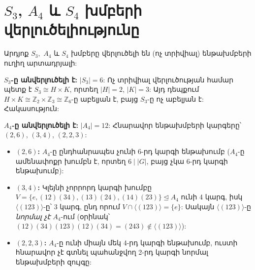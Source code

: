 \documentclass[12pt,a4paper]{article}
\newcommand{\armtext}{} %
\newenvironment{problem}{\begin{mdframed}[style=problemstyle]\armtext}{\end{mdframed}}
\newenvironment{sol}{\begin{mdframed}[style=solstyle]\armtext}{\end{mdframed}}
\newcommand{\Z}{\mathbb{Z}}
\newcommand{\gen}[1]{\langle #1 \rangle}
\newcommand{\normal}{\trianglelefteq}
\begin{document}
\bigskip
\section{\armtext{$S_3$, $A_4$ և $S_4$ խմբերի վերլուծելիությունը}}

\begin{problem}
Արդյոք $S_{3},$ $A_{4}$ և $S_{4}$ խմբերը վերլուծելի են (ոչ տրիվիալ) ենթախմբերի ուղիղ արտադրյալի:
\end{problem}

\begin{sol}
\textbf{\color{SectCol}$S_3$-ը անվերլուծելի է:}\;
$|S_3| = 6$: Ոչ տրիվիալ վերլուծության համար պետք է $S_3 \cong H \times K$, որտեղ
$|H|=2$, $|K|=3$: Այդ դեպքում $H \times K \cong \Z_2 \times \Z_3 \cong \Z_6$-ը
աբելյան է, բայց $S_3$-ը ոչ աբելյան է: Հակասություն:

\medskip
\textbf{\color{SectCol}$A_4$-ը անվերլուծելի է:}\;
$|A_4|=12$: Հնարավոր ենթախմբերի կարգերը՝ $(2,6)$, $(3,4)$, $(2,2,3)$:

\begin{itemize}[leftmargin=*]
  \item \textbf{$(2,6)$:} $A_4$-ը ընդհանրապես չունի 6-րդ կարգի ենթախումբ
    ($A_4$-ը ամենափոքր խումբն է, որտեղ $6 \mid |G|$, բայց չկա 6-րդ կարգի ենթախումբ):

  \item \textbf{$(3,4)$:} Կլեյնի չորրորդ կարգի խումբը
    $V = \{e, (12)(34), (13)(24), (14)(23)\} \normal A_4$
    ունի 4 կարգ, իսկ $\gen{(123)}$-ը՝ 3 կարգ, ընդ որում
    $V \cap \gen{(123)} = \{e\}$: Սակայն $\gen{(123)}$-ը
    \emph{նորմալ չէ} $A_4$-ում (օրինակ՝
    $(12)(34)(123)(12)(34) = (243) \notin \gen{(123)}$):

  \item \textbf{$(2,2,3)$:} $A_4$-ը ունի միայն մեկ 4-րդ կարգի ենթախումբ,
    ուստի հնարավոր չէ գտնել պահանջվող 2-րդ կարգի նորմալ ենթախմբերի զույգը:
\end{itemize}

\begin{center}
\end{center}


\end{sol}
\end{document}
